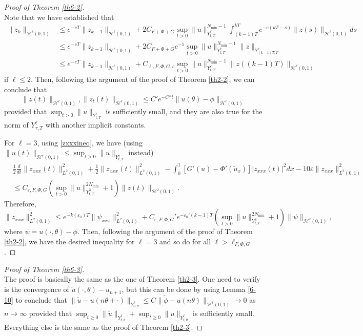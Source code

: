 \documentclass[10pt,a4paper,final]{article}
\numberwithin{equation}{section}
\newcommand{\cH}{\mathcal{H}}
\newcommand{\Ge}{\varepsilon}
\begin{document}
\begin{proof}[Proof of Theorem \ref{th6-2}]\ \\
Note that we have established that 
\begin{align*}
    \|z_{k}\|_{\cH^{\ell}(0,1)}&\leq e^{-cT}\|z_{k-1}\|_{\cH^{\ell}(0,1)}+2C_{F+\Phi+G}\sup_{t>0}\|u\|_{Y^{\ell}_{t,T}}^{N_{\min}-1}\int_{(k-1)T}^{kT}e^{-c(kT-s)}\|z(s)\|_{\cH^{\ell}(0,1)}ds \\
    &\leq e^{-cT}\|z_{k-1}\|_{\cH^{\ell}(0,1)}+2C_{F+\Phi+G}c^{-1}\sup_{t>0}\|u\|_{Y^{\ell}_{t,T}}^{N_{\min}-1}\|z\|_{Y^{\ell}_{(k-1)T,T}}  \\
    &\leq e^{-cT}\|z_{k-1}\|_{\cH^{\ell}(0,1)}+C_{\ell,F,\Phi,G,c}\sup_{t>0}\|u\|_{Y^{\ell}_{t,T}}^{N_{\min}-1} \|z((k-1)T)\|_{\cH^{\ell}(0,1)}
\end{align*}
if $\ell\leq 2$. Then, following the argument of the proof of Theorem \ref{th2-2}, we can conclude that 
$$\|z(t)\|_{\cH^{\ell}(0,1)},\|z_t(t)\|_{\cH^{\ell}(0,1)}\leq C'e^{-C''t}\|u(\theta)-\phi\|_{\cH^{\ell}(0,1)}$$
provided that $\sup_{t>0}\|u\|_{Y^\ell_{t,T}}$ is sufficiently small, and they are also true for the norm of $Y^{\ell}_{\tau,T}$ with another implicit constants.

For $\ell=3$, using \eqref{zxxxineq}, we have (using $\|u(t)\|_{\cH^s(0,1)}\leq \sup_{t>0}\|u\|_{Y^{s}_{t,T}}$ instead)
\begin{align*}
    &\frac{1}{2}\frac{d}{dt}\|z_{xxx}(t)\|_{L^2(0,1)}^2+\frac{1}{2}\|z_{xxx}(t)\|_{L^2(0,1)}^2-\int_0^1[G'(u)-\Phi'(\widetilde{u}_x)]|z_{xxx}(t)|^2dx-10\Ge\|z_{xxx}\|_{L^2(0,1)}^2\\
    &\leq C_{\Ge,F,\Phi,G}(\sup_{t>0}\|u\|_{Y^3_{t,T}}^{2N_{\min}}+1)\|z(t)\|_{\cH^{2}(0,1)}.
\end{align*}
Therefore, 
$$\|z_{xxx}\|_{L^2(0,1)}^2\leq e^{-k(\Ge_0)T}\|\psi_{xxx}\|_{L^2(0,1)}^2+C_{\Ge,F,\Phi,G}'e^{-\Ge_0'(k-1)T}(\sup_{t>0}\|u\|_{Y^3_{t,T}}^{2N_{\min}}+1)\|\psi\|_{\cH^2(0,1)},$$
where $\psi=u(\cdot,\theta)-\phi$. Then, following the argument of the proof of Theorem \ref{th2-2}, we have the desired inequality for $\ell=3$ and so do for all $\ell>\ell_{F,\Phi,G}$.
\end{proof}
\begin{proof}[Proof of Theorem \ref{th6-3}]\ \\
The proof is basically the same as the  one of Theorem \ref{th2-3}. One need to verify is the convergence of $\widetilde{u}(\cdot,\theta)-u_{n+1}$, but this can be done by using Lemma \ref{6-10} to conclude that $\|\widetilde{u}-u(n\theta+\cdot)\|_{Y^{\ell}_{0,\theta}}\leq C\|\widetilde{\phi}-u(n\theta)\|_{\cH^{\ell}(0,1)}\to 0$ as $n\to \infty$ provided that 
$\sup_{t\geq 0}\|\widetilde{u}\|_{Y^{\ell}_{t,\theta}}+\sup_{t\geq 0}\|u\|_{Y^{\ell}_{t,\theta}}$ is sufficiently small. Everything else is the same as the proof of Theorem \ref{th2-3}.
\end{proof}
\end{document}
